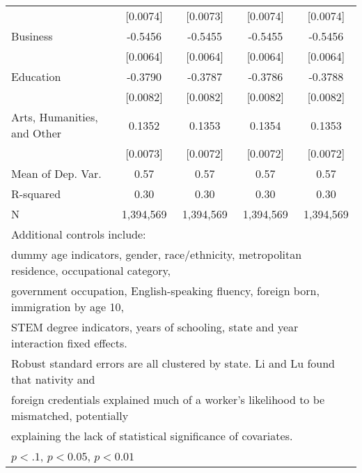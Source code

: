 \begin{table}[htbp]
\begin{tabular}{l*{4}{c}}
                    &    [0.0074]         &    [0.0073]         &    [0.0074]         &    [0.0074]         \\
\addlinespace
Business            &     -0.5456\sym{***}&     -0.5455\sym{***}&     -0.5455\sym{***}&     -0.5456\sym{***}\\
                    &    [0.0064]         &    [0.0064]         &    [0.0064]         &    [0.0064]         \\
\addlinespace
Education           &     -0.3790\sym{***}&     -0.3787\sym{***}&     -0.3786\sym{***}&     -0.3788\sym{***}\\
                    &    [0.0082]         &    [0.0082]         &    [0.0082]         &    [0.0082]         \\
\addlinespace
Arts, Humanities, and Other&      0.1352\sym{***}&      0.1353\sym{***}&      0.1354\sym{***}&      0.1353\sym{***}\\
                    &    [0.0073]         &    [0.0072]         &    [0.0072]         &    [0.0072]         \\
\midrule
Mean of Dep. Var.   &        0.57         &        0.57         &        0.57         &        0.57         \\
R-squared           &        0.30         &        0.30         &        0.30         &        0.30         \\
N                   &   1,394,569         &   1,394,569         &   1,394,569         &   1,394,569         \\
\bottomrule
\multicolumn{5}{l}{\footnotesize Additional controls include:}\\
\multicolumn{5}{l}{\footnotesize dummy age indicators, gender, race/ethnicity, metropolitan residence, occupational category,}\\
\multicolumn{5}{l}{\footnotesize government occupation, English-speaking fluency, foreign born, immigration by age 10,}\\
\multicolumn{5}{l}{\footnotesize STEM degree indicators, years of schooling, state and year interaction fixed effects.}\\
\multicolumn{5}{l}{\footnotesize Robust standard errors are all clustered by state. Li and Lu found that nativity and}\\
\multicolumn{5}{l}{\footnotesize foreign credentials explained much of a worker's likelihood to be mismatched, potentially}\\
\multicolumn{5}{l}{\footnotesize explaining the lack of statistical significance of covariates.}\\
\multicolumn{5}{l}{\footnotesize \sym{*} \(p<.1\), \sym{**} \(p<0.05\), \sym{***} \(p<0.01\)}\\
\end{tabular}
\end{table}
